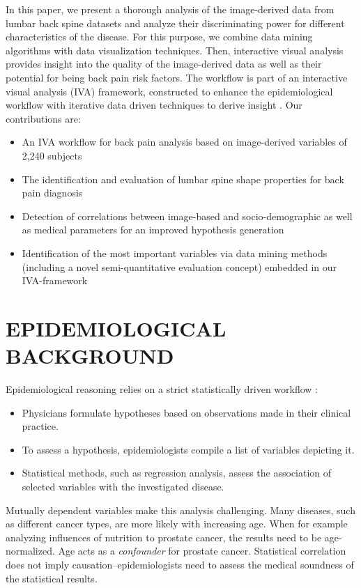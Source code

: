 \documentclass[a4paper,twoside]{style/article}
\begin{document}
In this paper, we present a thorough analysis of the image-derived data from lumbar back spine datasets and analyze their discriminating power for different characteristics of the disease.
For this purpose, we combine data mining algorithms with data visualization techniques.
Then, interactive visual analysis provides insight into the quality of the image-derived data as well as their potential for being back pain risk factors.
The workflow is part of an interactive visual analysis (IVA) framework, constructed to enhance the epidemiological workflow with iterative data driven techniques to derive insight \cite{Klemm2014VIS}.
Our contributions are:
\begin{itemize}
\item An IVA workflow for back pain analysis based on image-derived variables of 2,240 subjects
\item The identification and evaluation of lumbar spine shape properties for back pain diagnosis
\item Detection of correlations between image-based and socio-demographic as well as medical parameters for an improved hypothesis generation
\item Identification of the most important variables via data mining methods (including a novel semi-quantitative evaluation concept) embedded in our IVA-framework
\end{itemize}
\section{\uppercase{Epidemiological Background}}
\label{sec:EpidemiologicalBackground}
\noindent Epidemiological reasoning relies on a strict statistically driven workflow \cite{Fletcher}:
\begin{itemize}
	\item Physicians formulate hypotheses based on observations made in their clinical practice.
	\item To assess a hypothesis, epidemiologists compile a list of variables depicting it.
	\item Statistical methods, such as regression analysis, assess the association of selected variables with the investigated disease.
\end{itemize}
Mutually dependent variables make this analysis challenging.
Many diseases, such as different cancer types, are more likely with increasing age.
When for example analyzing influences of nutrition to prostate cancer, the results need to be age-normalized.
Age acts as a \emph{confounder} for prostate cancer.
Statistical correlation does not imply causation--epidemiologists need to assess the medical soundness of the statistical results.
\end{document}
